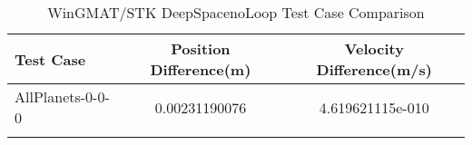 \begin{table}[htbp!]
\centering
\caption{ WinGMAT/STK DeepSpacenoLoop Test Case Comparison}
      \begin{tabular}{lcc}
      \hline\hline
          Test Case & Position Difference(m) & Velocity Difference(m/s) \\
         \hline
         AllPlanets-0-0-0 & 0.00231190076 & 4.619621115e-010 \\
      \hline\hline
      \label{Table: DeepSpacenoLoop WinGMAT-STK Table} 
\end{tabular}
\end{table}
